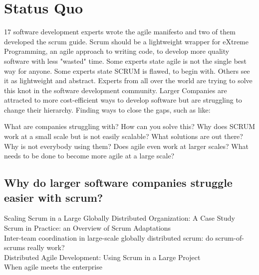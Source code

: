 % 
\section*{Status Quo}

17 software development experts wrote the agile manifesto and two of them developed the scrum guide. Scrum should be a lightweight wrapper for eXtreme Programming, an agile approach to writing code, to develop more quality software with less "wasted" time. Some experts state agile is not the single best way for anyone. Some experts state SCRUM is flawed, to begin with. Others see it as lightweight and abstract. Experts from all over the world are trying to solve this knot in the software development community. Larger Companies are attracted to more cost-efficient ways to develop software but are struggling to change their hierarchy. Finding ways to close the gaps, such as like: 

What are companies struggling with? How can you solve this? Why does SCRUM work at a small scale but is not easily scalable? What solutions are out there? Why is not everybody using them? Does agile even work at larger scales? What needs to be done to become more agile at a large scale?

\subsection*{Why do larger software companies struggle easier with scrum?}

Scaling Scrum in a Large Globally Distributed Organization: A Case Study\citep{paasivaara2016scaling}\\
Scrum in Practice: an Overview of Scrum Adaptations\citep{hron2018scrum}\\
Inter-team coordination in large-scale globally distributed scrum: do scrum-of-scrums really work?\citep{paasivaara2012inter}\\
Distributed Agile Development: Using Scrum in a Large Project\citep{paasivaara2008distributed}\\
When agile meets the enterprise\citep{van2013agile}\\

